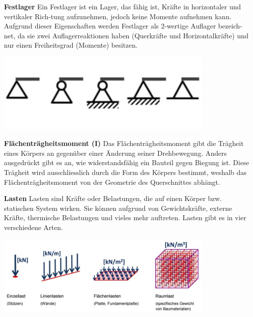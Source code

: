 \textbf{Festlager}
Ein Festlager ist ein Lager, das fähig ist, Kräfte in horizontaler und vertikaler Rich-tung aufzunehmen, jedoch keine Momente aufnehmen kann.
Aufgrund dieser Eigenschaften werden Festlager als 2-wertige Auflager bezeich-net, da sie zwei Auflagerreaktionen haben (Querkräfte und Horizontalkräfte) und nur einen Freiheitsgrad (Momente) besitzen.
\begin{center}
	\includegraphics[width=0.8\textwidth]{papers/balken/images/teil1/Festlager.jpg}
\end{center}
\label{Die Abbildung zeigt verschiedene Darstellungsweisen eines Festlagers in der Baustatik.}

\textbf{Flächenträgheitsmoment (I)}
Das Flächenträgheitsmoment gibt die Trägheit eines Körpers an gegenüber einer Änderung seiner Drehbewegung.
Anders ausgedrückt gibt es an, wie widerstandsfähig ein Bauteil gegen Biegung ist.
Diese Trägheit wird ausschliesslich durch die Form des Körpers bestimmt, weshalb das Flächenträgheitsmoment von der Geometrie des Querschnittes abhängt.

\textbf{Lasten}
Lasten sind Kräfte oder Belastungen, die auf einen Körper bzw. statischen System wirken.
Sie können aufgrund von Gewichtskräfte, externe Kräfte, thermische Belastungen und vieles mehr auftreten.
Lasten gibt es in vier verschiedene Arten.
\begin{center}
	\includegraphics[width=0.8\textwidth]{papers/balken/images/teil1/Lasten.jpg}
\end{center}
\label{Die Abbildung zeigt verschiedene Lasttypen, die in der Baustatik vorkommen.}

